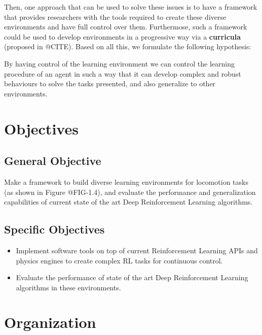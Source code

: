 Then, one approach that can be used to solve these issues is to have a framework
that provides researchers with the tools required to create these diverse environments
and have full control over them. Furthermose, such a framework could be used to develop
environments in a progressive way via a \textbf{curricula} (proposed in @CITE). Based on
all this, we formulate the following hypothesis:

\begin{hypothesis}
	By having control of the learning environment we can control the learning procedure
	of an agent in such a way that it can develop complex and robust behaviours to solve
	the tasks presented, and also generalize to other environments.
\end{hypothesis}

\figEnvManipSimToreal

\figEnvironmentsProposalFromTo

\section{Objectives}
\label{sec:objectives}

\subsection*{General Objective}
Make a framework to build diverse learning environments for locomotion tasks (as shown in Figure @FIG-1.4), 
and evaluate the performance and generalization capabilities of current state of the art Deep 
Reinforcement Learning algorithms.

\subsection*{Specific Objectives}
\begin{itemize}
 \item Implement software tools on top of current Reinforcement Learning APIs and physics engines 
       to create complex RL tasks for continuous control.
 \item Evaluate the performance of state of the art Deep Reinforcement Learning algorithms in these environments.
\end{itemize}

\section{Organization}
\label{sec:organization}


